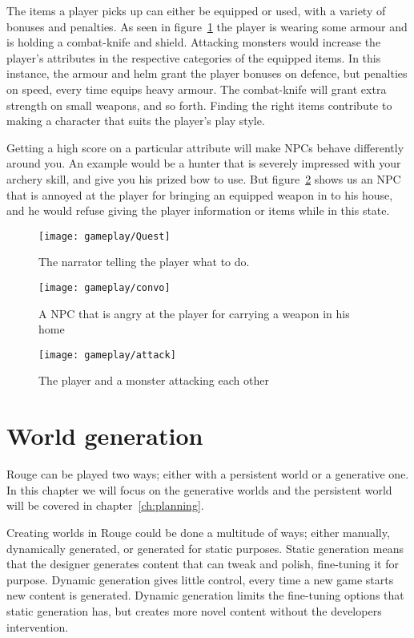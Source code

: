 The items a player picks up can either be equipped or used, with a variety of bonuses and penalties. 
As seen in figure~\ref{fig:quest} the player is wearing some armour and is holding a combat-knife and shield. 
Attacking monsters would increase the player's attributes in the respective categories of the equipped items. 
In this instance, the armour and helm grant the player bonuses on defence, but penalties on speed, every time \he equips heavy armour. 
The combat-knife will grant extra strength on small weapons, and so forth. 
Finding the right items contribute to making a character that suits the player's play style. 

Getting a high score on a particular attribute will make NPCs behave differently around you. 
An example would be a hunter that is severely impressed with your archery skill, and give you his prized bow to use. 
But figure~\ref{fig:convo} shows us an NPC that is annoyed at the player for bringing an equipped weapon in to his house, and he would refuse giving the player information or items while in this state.


\begin{figure}[h]
	\texttt{[image: gameplay/Quest]}
	\caption{The narrator telling the player what to do.}\label{fig:quest}
\end{figure}
\begin{figure}[h]
	\texttt{[image: gameplay/convo]}
	\caption{A NPC that is angry at the player for carrying a weapon in his home}\label{fig:convo}
\end{figure}
\begin{figure}[h]
	\texttt{[image: gameplay/attack]}
	\caption{The player and a monster attacking each other}\label{fig:attack}
\end{figure}

\section{World generation}
\label{sec:world_gen}
Rouge can be played two ways; either with a persistent world or a generative one. 
In this chapter we will focus on the generative worlds and the persistent world will be covered in chapter~\ref{ch:planning}.

Creating worlds in Rouge could be done a multitude of ways; either manually, dynamically generated, or generated for static purposes. 
Static generation means that the designer generates content that \he can tweak and polish, fine-tuning it for purpose.
Dynamic generation gives little control, every time a new game starts new content is generated. Dynamic generation limits the fine-tuning options that static generation has, but creates more novel content without the developers intervention.

